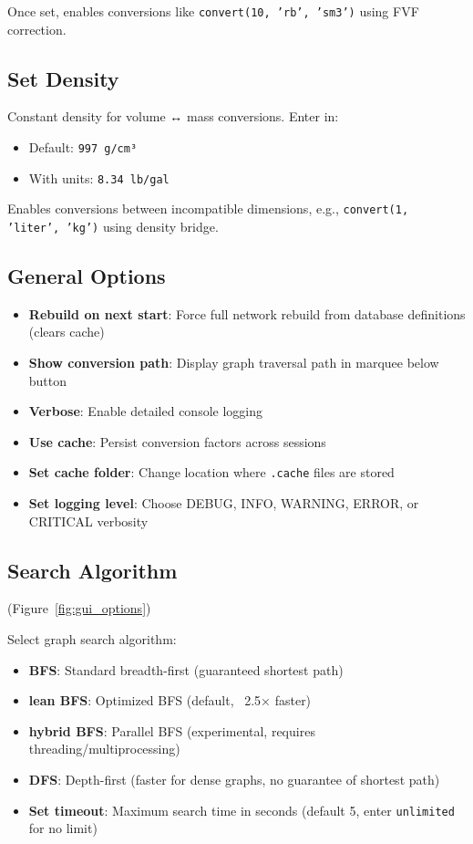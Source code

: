 \documentclass[11pt,a4paper]{report}
\begin{document}
Once set, enables conversions like \texttt{convert(10, 'rb', 'sm3')} using FVF correction.

\subsection{Set Density}

Constant density for volume ↔ mass conversions. Enter in:

\begin{itemize}
\item Default: \texttt{997 g/cm³}
\item With units: \texttt{8.34 lb/gal}
\end{itemize}

Enables conversions between incompatible dimensions, e.g., \texttt{convert(1, 'liter', 'kg')} using density bridge.

\subsection{General Options}

\begin{itemize}
\item \textbf{Rebuild on next start}: Force full network rebuild from database definitions (clears cache)
\item \textbf{Show conversion path}: Display graph traversal path in marquee below button
\item \textbf{Verbose}: Enable detailed console logging
\item \textbf{Use cache}: Persist conversion factors across sessions
\item \textbf{Set cache folder}: Change location where \texttt{.cache} files are stored
\item \textbf{Set logging level}: Choose DEBUG, INFO, WARNING, ERROR, or CRITICAL verbosity
\end{itemize}

\subsection{Search Algorithm} (Figure~\ref{fig:gui_options})

Select graph search algorithm:

\begin{itemize}
\item \textbf{BFS}: Standard breadth-first (guaranteed shortest path)
\item \textbf{lean BFS}: Optimized BFS (default, ~2.5× faster)
\item \textbf{hybrid BFS}: Parallel BFS (experimental, requires threading/multiprocessing)
\item \textbf{DFS}: Depth-first (faster for dense graphs, no guarantee of shortest path)
\item \textbf{Set timeout}: Maximum search time in seconds (default 5, enter \texttt{unlimited} for no limit)
\end{itemize}
\end{document}
